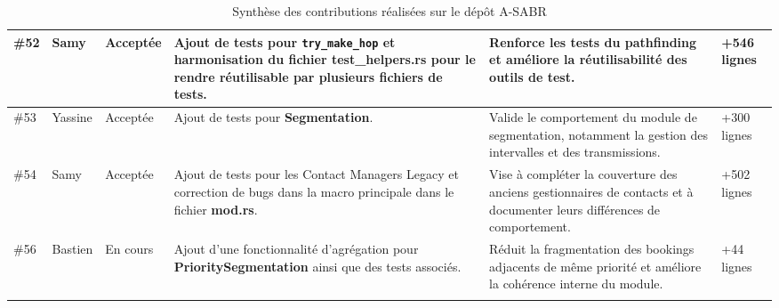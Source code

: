 \documentclass{article}
\begin{document}
\begin{longtable}{|p{}|p{}|p{}|p{}|p{}|p{}|}
\#52 & Samy & Acceptée
& Ajout de tests pour \texttt{try\_make\_hop} et harmonisation du fichier \textbf{test\_helpers.rs} pour le rendre réutilisable par plusieurs fichiers de tests.
& Renforce les tests du pathfinding et améliore la réutilisabilité des outils de test.
& +546 lignes \\
\hline

\#53 & Yassine & Acceptée
& Ajout de  tests pour \textbf{Segmentation}.
& Valide le comportement du module de segmentation, notamment la gestion des intervalles et des transmissions.
& +300 lignes \\
\hline

\#54 & Samy & Acceptée
& Ajout de tests pour les Contact Managers Legacy et correction de bugs dans la macro principale dans le fichier \textbf{mod.rs}.
& Vise à compléter la couverture des anciens gestionnaires de contacts et à documenter leurs différences de comportement.
& +502 lignes \\
\hline

\#56 & Bastien & En cours
& Ajout d’une fonctionnalité d’agrégation pour \textbf{PrioritySegmentation} ainsi que des tests associés.
& Réduit la fragmentation des bookings adjacents de même priorité et améliore la cohérence interne du module.
& +44 lignes \\
\hline

\caption{Synthèse des contributions réalisées sur le dépôt A-SABR}
\label{tab:contributions-asabr}
\end{longtable}

\newpage
\end{document}
